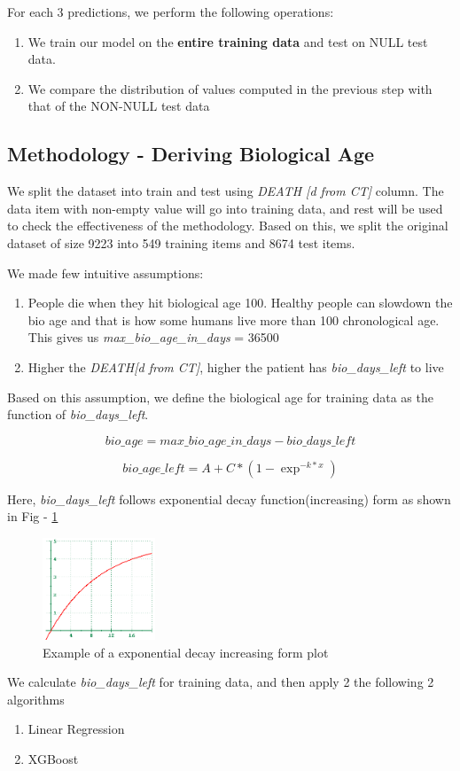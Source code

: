 For each 3 predictions, we perform the following operations:
\begin{enumerate}
    \item We train our model on the \textbf{entire training data} and test on NULL test data.
    \item We compare the distribution of values computed in the previous step with that of the NON-NULL test data
\end{enumerate}

\subsection{Methodology - Deriving Biological Age}
We split the dataset into train and test using \textit{DEATH [d from CT]} column. The data item with non-empty value will go into training data, and rest will be used to check the effectiveness of the methodology. Based on this, we split the original dataset of size 9223 into 549 training items and 8674 test items.

We made few intuitive assumptions:
\begin{enumerate}
    \item People die when they hit biological age 100. Healthy people can slowdown the bio age and that is how some humans live more than 100 chronological age. This gives us \textit{max\_bio\_age\_in\_days} = 36500
    \item Higher the \textit{DEATH[d from CT]}, higher the patient has \textit{ bio\_days\_left} to live
\end{enumerate}

Based on this assumption, we define the biological age for training data as the function of \textit{bio\_days\_left}.

\[ bio\_age = max\_bio\_age\_in\_days - bio\_days\_left  \]

\[ bio\_age\_left = A + C*(1-\exp^{-k*x}) \]

Here, \textit{bio\_days\_left} follows exponential decay 
function(increasing) form as shown in Fig - \ref{fig:exp_decay}

\begin{figure}[H]
\centering
\includegraphics[width=0.3\textwidth]{images/exp_fn.png}
\caption{Example of a exponential decay increasing form plot}
\label{fig:exp_decay}
\end{figure}


We calculate \textit{bio\_days\_left} for training data, and then apply 2 the following 2 algorithms
\begin{enumerate}
    \item Linear Regression
    \item {XGBoost}
\end{enumerate}



